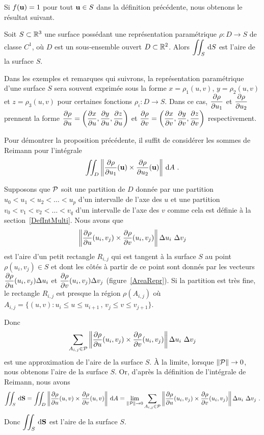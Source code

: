 {Si $f(\mathbf{u}) = 1$ pour tout $\mathbf{u} \in S$ dans la définition
précédente, nous obtenons le résultat suivant.

\begin{prop}
Soit $S \subset \mathbb{R}^3$ une surface possédant une représentation
paramétrique $\rho:D\rightarrow S$ de classe $C^1$, où $D$ est un
sous-ensemble ouvert $D \subset \mathbb{R}^2$.  Alors
$\displaystyle \iint_S \,\mathrm{d}S$ est l'aire de la surface $S$.
\end{prop}

\begin{rmk}
Dans les exemples et remarques qui suivrons, la
représentation paramétrique d'une surface $S$ sera souvent exprimée
sous la forme $x = \rho_1(u,v)$, $y=\rho_2(u,v)$ et $z = \rho_3(u,v)$ 
pour certaines fonctions $\rho_i:D\to S$.  Dans ce cas,
$\displaystyle \frac{\partial \rho}{\partial u_1}$
et $\displaystyle \frac{\partial \rho}{\partial u_2}$ prennent la forme
$\displaystyle \frac{\partial \rho}{\partial u}
= \left( \frac{\partial x}{\partial u} , \frac{\partial y}{\partial u} , \frac{\partial z}{\partial u} \right)$
et
$\displaystyle
\frac{\partial \rho}{\partial v} = \left( \frac{\partial x}{\partial v} , \frac{\partial y}{\partial v} , \frac{\partial z}{\partial v} \right)$
respectivement.
\end{rmk}

\begin{rmk}[\theory]
Pour démontrer la proposition précédente, il suffit de considérer les
sommes de Reimann pour l'intégrale
\[
\iint_D \left\|\frac{\partial \rho}{\partial u_1}(\mathbf{u}) \times
\frac{\partial \rho}{\partial u_2}(\mathbf{u})\right\| \,\mathrm{d}A \ .
\]

Supposons que $\cal P$ soit une partition de $D$ donnée par une partition
$u_0 < u_1 < u_2 < \ldots < u_p$ d'un intervalle de l'axe des $u$ et
une partition $v_0 < v_1 < v_2 < \ldots < v_{q}$ d'un intervalle de
l'axe des $v$ comme cela est définie à la section~\ref{DefIntMulti}.
Nous avons que
\[
\left\| \frac{\partial \rho}{\partial u}(u_i,v_j) \times \frac{\partial \rho}{\partial v}(u_i,v_j) \right\|
\Delta u_i \ \Delta v_j
\]
est l'aire d'un petit rectangle $R_{i,j}$ qui est tangent
à la surface $S$ au point $\rho(u_i,v_j) \in S$ et dont les côtés à
partir de ce point sont donnés par les vecteurs
$\displaystyle \frac{\partial \rho}{\partial u}(u_i,v_j) \Delta u_i$ et
$\displaystyle \frac{\partial \rho}{\partial v}(u_i,v_j) \Delta v_j$
(figure~\ref{AreaRepr}).  Si
la partition est très fine, le rectangle $R_{i,j}$ est presque la région
$\rho(A_{i,j})$ où
$A_{i,j} = \{(u,v) : u_i \leq u \leq u_{i+1}\, , \, v_j\leq v \leq v_{j+1}\}$.

Donc
\[
\sum_{A_{i,j}\in\cal P}
\left\| \frac{\partial \rho}{\partial u}(u_i,v_j) \times \frac{\partial \rho}{\partial v}(u_i,v_j) \right\|
\Delta u_i \ \Delta v_j
\]
est une approximation de l'aire de la surface $S$.  À la limite,
lorsque $\|{\cal P}\| \to 0$, nous obtenons l'aire de la surface $S$.
Or, d'après la définition de l'intégrale de Reimann, nous avons
\[
\iint_S \,\mathrm{d}\mathbf{S}
= \iint_D \left\|\frac{\partial \rho}{\partial u}(u,v)
\times \frac{\partial \rho}{\partial v}(u,v)\right\| \,\mathrm{d}A
=
\lim_{\|{\cal P}\|\to 0} \sum_{A_{i,j}\in\cal P}
\left\| \frac{\partial \rho}{\partial u}(u_i,v_j) \times \frac{\partial \rho}{\partial v}(u_i,v_j) \right\|
\Delta u_i \ \Delta v_j \ .
\]
Donc $\displaystyle \iint_S \,\mathrm{d}\mathbf{S}$ est l'aire de la surface $S$.
\label{AreaReprRMK}
\end{rmk}

}
